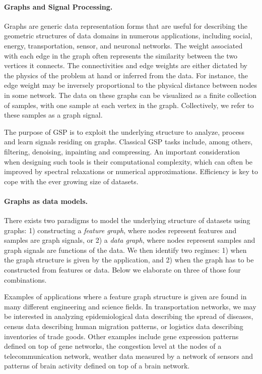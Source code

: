 \documentclass[a4paper]{scrartcl}
\begin{document}
\paragraph{Graphs and Signal Processing.}
Graphs are generic data representation forms that are useful for describing the
geometric structures of data domains in numerous applications, including social,
energy, transportation, sensor, and neuronal networks.
The weight associated with each edge in the graph often represents the
similarity between the two vertices it connects. The connectivities and edge
weights are either dictated by the physics of the problem at hand or inferred
from the data. For instance, the edge weight may be inversely proportional to
the physical distance between nodes in some network.
The data on these graphs can be visualized as a finite collection of samples,
with one sample at each vertex in the graph. Collectively, we refer to these
samples as a graph signal. 

The purpose of GSP is to exploit the underlying structure to analyze, process
and learn signals residing on graphs. 
Classical GSP tasks include, among others, filtering, denoising, inpainting and
compressing. An important consideration when designing such tools is their
computational complexity, which can often be improved by spectral relaxations or
numerical approximations. Efficiency is key to cope with the ever growing size
of datasets.


\paragraph{Graphs as data models.}
There exists two paradigms to model the underlying structure of datasets using
graphs: 1) constructing a \textit{feature graph}, where nodes represent features
and samples are graph signals, or 2) a \textit{data graph}, where nodes
represent samples and graph signals are functions of the data. We then identify
two regimes: 1) when the graph structure is given by the application, and 2)
when the graph has to be constructed from features or data. Below we elaborate
on three of those four combinations.

Examples of applications where a feature graph structure is given are found in
many different engineering and science fields. In transportation networks, we
may be interested in analyzing epidemiological data describing the spread of
diseases, census data describing human migration patterns, or logistics data
describing inventories of trade goods. Other examples include gene expression
patterns defined on top of gene networks, the congestion level at the nodes of a
telecommunication network, weather data measured by a network of sensors and
patterns of brain activity defined on top of a brain network.
\end{document}

